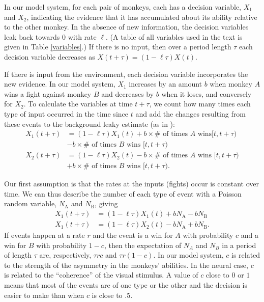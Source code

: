 \documentclass{pnastwo}
\begin{document}
\begin{article}
In our model system, for each pair of monkeys, each has a decision variable, $X_1$ and $X_2$, indicating the evidence that it has accumulated about its ability relative to the other monkey. In the absence of new information, the decision variables leak back towards $0$ with rate $\ell$.  (A table of all variables used in the text is given in Table \ref{variables}.)  If there is no input, then over a period length $\tau$ each decision variable decreases as $X(t+\tau)=(1-\ell\tau)X(t)$. 

If there is input from the environment, each decision variable incorporates the new evidence.  In our model system,  $X_1$ increases by an amount $b$ when monkey $A$ wins a fight against monkey $B$ and decreases by $b$ when it loses, and conversely for $X_2$.  To calculate the variables at time $t+\tau$, we  count how many times each type of input occurred in the time since $t$ and add the changes resulting from these events to the background leaky estimate (as in \cite{Gillespie:2000fk}):
\begin{align*}
X_1(t+\tau)&=(1-\ell\tau)X_1(t)+b\times\# \text{ of times $A$  wins}[t,t+\tau)\\&-b\times\# \text{ of times $B$ wins }[t,t+\tau)
\\ X_2(t+\tau)&=(1-\ell\tau)X_2(t)-b\times\# \text{ of times $A$ wins }[t,t+\tau)\\&+b\times\# \text{ of times $B$ wins }[t,t+\tau). 
\end{align*}

Our first assumption is that the rates at the inputs (fights) occur is constant over time.  We can thus describe the number of each type of event with a Poisson random variable, $N_\text{A}$ and $N_\text{B}$, giving 
\begin{align*}
X_1(t+\tau)&=(1-\ell\tau)X_1(t)+bN_\text{A}-bN_\text{B}
\\ X_1(t+\tau)&=(1-\ell\tau)X_2(t)-bN_\text{A}+bN_\text{B}.
\end{align*}
If events happen at a rate $r$ and the event is a win for $A$ with probability $c$ and a win for $B$ with probability $1-c$, then the expectation of $N_A$ and $N_B$ in a period of length $\tau$ are, respectively, $\tau r c$ and $\tau r(1-c)$. In our model system, $c$ is related to the strength of the asymmetry in the monkeys' abilities. In the neural case, $c$ is related to the ``coherence'' of the visual stimulus.  A value of $c$ close to $0$ or $1$ means that most of the events are of one type or the other and the decision is easier to make than when $c$ is close to $.5$.


\end{article}
\end{document}
